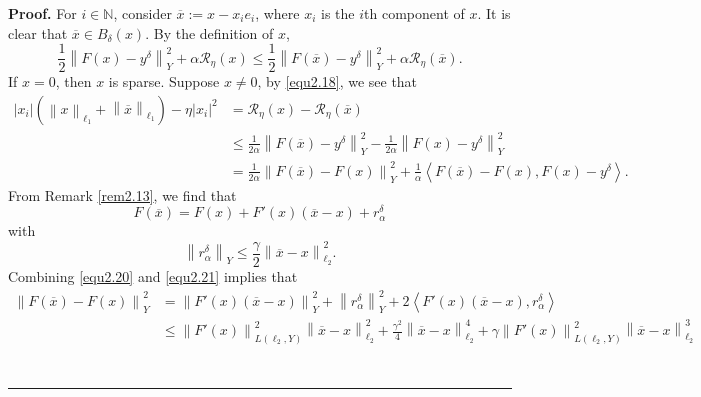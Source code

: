 \documentclass[a4paper,12pt]{article}
\numberwithin{equation}{section}
\newenvironment{proof}[1][Proof]{\textbf{#1.} }
{\ \rule{0.75em}{0.75em}\smallskip}
\begin{document}
\begin{proof}
    For $i\in\mathbb{N}$, consider $\overline{x}:=x-x_{i}e_{i}$, where $x_{i}$ is the $i$th component of $x$. It is clear that $\overline{x}\in B_{\delta}\left(x\right)$. By the definition of $x$,
    \begin{equation}\label{equ2.18}
        \frac{1}{2}\left\|F\left(x\right)-y^{\delta}\right\|_{Y}^{2}+ \alpha\mathcal{R}_{\eta}\left(x\right) \leq \frac{1}{2}\left\|F\left(\overline{x}\right)-y^{\delta}\right\|_{Y}^{2}+ \alpha\mathcal{R}_{\eta}\left(\overline{x}\right).
    \end{equation}
    If $x=0$, then $x$ is sparse. Suppose $x\neq 0$, by \eqref{equ2.18}, we see that
    \begin{align}\label{equ2.19}
        \left|x_{i}\right|\left(\left\|x\right\|_{\ell_{1}}+ \left\|\overline{x}\right\|_{\ell_{1}}\right)-\eta\left|x_{i}\right|^{2}
        & = \mathcal{R}_{\eta}\left(x\right)-\mathcal{R}_{\eta}\left(\overline{x}\right) \nonumber\\
        & \leq \frac{1}{2\alpha}\left\|F\left(\overline{x}\right)-y^{\delta}\right\|_{Y}^{2} -\frac{1}{2\alpha}\left\|F\left(x\right)-y^{\delta}\right\|_{Y}^{2} \nonumber\\
        & = \frac{1}{2\alpha}\left\|F\left(\overline{x}\right)-F\left(x\right)\right\|_{Y}^{2} +\frac{1}{\alpha}\left<F\left(\overline{x}\right)-F\left(x\right), F\left(x\right)-y^{\delta}\right>. 
    \end{align}
    From Remark \ref{rem2.13}, we find that
    \begin{equation}\label{equ2.20}
        F\left(\overline{x}\right)=F\left(x\right)+F'\left(x\right)\left(\overline{x}-x\right) +r_{\alpha}^{\delta}
    \end{equation}
    with
    \begin{equation}\label{equ2.21}
        \left\|r_{\alpha}^{\delta}\right\|_{Y}\leq\frac{\gamma}{2}\left\|\overline{x} -x\right\|_{\ell_{2}}^{2}.
    \end{equation}
    Combining \eqref{equ2.20} and \eqref{equ2.21} implies that 
    \begin{align}\label{equ2.22}
        \left\|F\left(\overline{x}\right)-F\left(x\right)\right\|_{Y}^{2}
        & =  \left\|F'\left(x\right)\left(\overline{x}-x\right)\right\|_{Y}^{2} +\left\|r_{\alpha}^{\delta}\right\|_{Y}^{2}+ 2\left<F'\left(x\right)\left(\overline{x}-x\right), r_{\alpha}^{\delta}\right>   \nonumber\\
        & \leq \left\|F'\left(x\right)\right\|_{L\left(\ell_{2}, Y\right)}^{2}\left\|\overline{x}-x\right\|_{\ell_{2}}^{2}+ \frac{\gamma^{2}}{4}\left\|\overline{x}-x\right\|_{\ell_{2}}^{4}+ \gamma\left\|F'\left(x\right)\right\|_{L\left(\ell_{2}, Y\right)}^{2}\left\|\overline{x}-x\right\|_{\ell_{2}}^{3} \nonumber\\

\end{align}
\end{proof}
\end{document}
